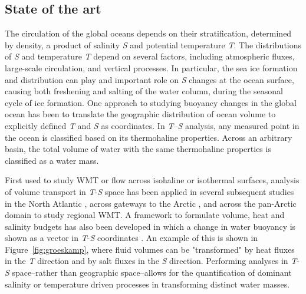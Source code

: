 \documentclass[a4paper,12pt]{article}
\begin{document}
    \subsection{State of the art}
    The circulation of the global oceans depends on their stratification, determined by density, a product of salinity \emph{S} and potential temperature \emph{T}. The distributions of \emph{S} and temperature \emph{T} depend on several factors, including atmospheric fluxes, large-scale circulation, and vertical processes. In particular, the sea ice formation and distribution can play and important role on \emph{S} changes at the ocean surface, causing both freshening and salting of the water column, during the seasonal cycle of ice formation. One approach to studying buoyancy changes in the global ocean has been to translate the geographic distribution of ocean volume to explicitly defined \emph{T} and \emph{S} as coordinates. In \emph{T}--\emph{S} analysis, any measured point in the ocean is classified based on its thermohaline properties. Across an arbitrary basin, the total volume of water with the same thermohaline properties is classified as a water mass. 
    
    First used to study WMT or flow across isohaline \cite{Walin_1977} or isothermal \cite{Walin1982} surfaces, analysis of volume transport in \emph{T}-\emph{S} space has been applied in several subsequent studies in the North Atlantic \cite{Speer1993}, across gateways to the Arctic \cite{Rudels2008}, and across the pan-Arctic domain \cite{Pemberton2015} to study regional WMT. A framework to formulate volume, heat and salinity budgets has also been developed in which a change in water buoyancy is shown as a vector in \emph{T}-\emph{S} coordinates \cite{Speer1993,Hieronymus2014}. An example of this is shown in Figure~\ref{fig:groeskamp}, where fluid volumes can be "transformed" by heat fluxes in the \emph{T} direction and by salt fluxes in the \emph{S} direction. Performing analyses in \emph{T}-\emph{S} space–rather than geographic space–allows for the quantification of dominant salinity or temperature driven processes in transforming distinct water masses.
\end{document}
